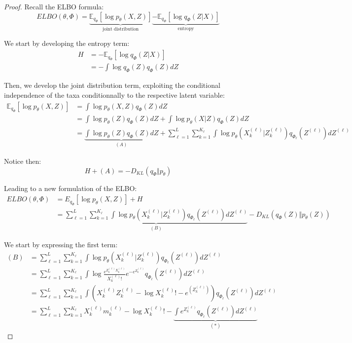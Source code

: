 \begin{proof}
    Recall the ELBO formula:
    $$
    ELBO(\theta, \Phi) = \underbrace{\mathbb{E}_{q_{\Phi}}\left[\log p_{\theta}(X,Z) \right]}_{\text{joint distribution}}
                         \underbrace{-\mathbb{E}_{q_{\Phi}}\left[\log q_{\Phi}(Z|X) \right]}_{\text{entropy}}
    $$

    We start by developing the entropy term:
    $$
    \begin{align}
        H &= - \mathbb{E}_{q_{\Phi}}\left[\log q_{\Phi}(Z|X) \right] \\
            &= - \int \log q_{\Phi}(Z) q_{\Phi}(Z) dZ
    \end{align}
    $$

    Then, we develop the joint distribution term, exploiting the conditional independence of the taxa conditionnally to the respective latent variable:
    $$
    \begin{align}
        \mathbb{E}_{q_{\Phi}}\left[\log p_{\theta}(X,Z) \right] &= \int \log p_{\theta}(X,Z) q_{\Phi}(Z) dZ \\
                                                                &= \int \log p_{\theta}(Z) q_{\Phi}(Z) dZ + \int \log p_{\theta}(X|Z) q_{\Phi}(Z) dZ \\
                                                                &= \underbrace{\int \log p_{\theta}(Z) q_{\Phi}(Z) dZ}_{(A)} + \sum_{\ell=1}^L \sum_{k=1}^{K_{\ell}} \int \log p_{\theta}(X_k^{(\ell)} | Z_k^{(\ell)}) q_{\Phi_{\ell}}(Z^{(\ell)}) dZ^{(\ell)}
    \end{align}
    $$

    Notice then:
    $$
    H + (A) = - D_{KL}(q_{\Phi} \Vert p_{\theta})
    $$

    Leading to a new formulation of the ELBO:
    $$
    \begin{align}
        ELBO(\theta, \Phi) &= E_{q_{\Phi}}\left[\log p_{\theta}(X,Z) \right] + H \\
                            &= \underbrace{\sum_{\ell=1}^L \sum_{k=1}^{K_{\ell}} \int \log p_{\theta}(X_k^{(\ell)} | Z_k^{(\ell)}) q_{\Phi_{\ell}}(Z^{(\ell)}) dZ^{(\ell)}}_{(B)} - D_{KL}(q_{\Phi}(Z) \Vert p_{\theta}(Z))
    \end{align}
    $$

    We start by expressing the first term:
    $$
    \begin{align}
        (B) &= \sum_{\ell=1}^L \sum_{k=1}^{K_{\ell}} \int \log p_{\theta}(X_k^{(\ell)} | Z_k^{(\ell)}) q_{\Phi_{\ell}}(Z^{(\ell)}) dZ^{(\ell)} \\
            &= \sum_{\ell=1}^L \sum_{k=1}^{K_{\ell}} \int \log \frac{e^{Z_k^{(\ell)} X_k^{(\ell)}}}{X_k^{(\ell)}!}e^{-e^{Z_k^{(\ell)}}} q_{\Phi_{\ell}}(Z^{(\ell)}) dZ^{(\ell)} \\
            &= \sum_{\ell=1}^L \sum_{k=1}^{K_{\ell}} \int (X_k^{(\ell)} Z_k^{(\ell)} - \log X_k^{(\ell)}! - e^{(Z_k^{(\ell)})}) q_{\Phi_{\ell}}(Z^{(\ell)}) dZ^{(\ell)} \\
            &= \sum_{\ell=1}^L \sum_{k=1}^{K_{\ell}} X_k^{(\ell)} m_k^{(\ell)} - \log X_k^{(\ell)}! - \underbrace{\int e^{Z_k^{(\ell)}} q_{\Phi_{\ell}}(Z^{(\ell)}) dZ^{(\ell)}}_{(*)}
    \end{align}
    $$


\end{proof}
